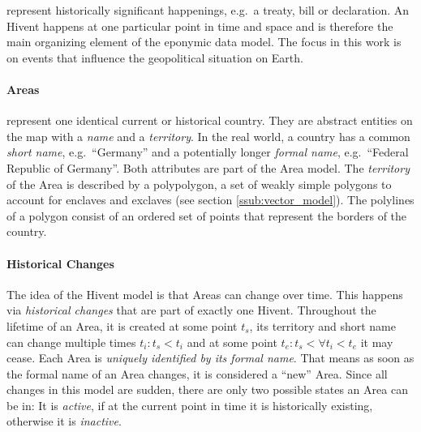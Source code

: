 represent historically significant happenings, e.g.\ a treaty, bill or declaration.
An Hivent happens at one particular point in time and space and is therefore the main organizing element of the eponymic data model.
The focus in this work is on events that influence the geopolitical situation on Earth.


\vspace{-1em}
\paragraph{Areas} %
\label{par:area}

represent one identical current or historical country. They are abstract entities on the map with a \emph{name} and a \emph{territory}. In the real world, a country has a common \emph{short name}, e.g.\ ``Germany'' and a potentially longer \emph{formal name}, e.g.\ ``Federal Republic of Germany''. Both attributes are part of the Area model. The \emph{territory} of the Area is described by a polypolygon, a set of weakly simple polygons to account for enclaves and exclaves (see section \ref{ssub:vector_model}). The polylines of a polygon consist of an ordered set of points that represent the borders of the country.


\vspace{-1em}
\paragraph{Historical Changes} %
\label{par:historical_changes}

The idea of the Hivent model is that Areas can change over time. This happens via \emph{historical changes} that are part of exactly one Hivent. Throughout the lifetime of an Area, it is created at some point $t_s$, its territory and short name can change multiple times $t_i: t_s < t_i$ and at some point $t_e: t_s < \forall t_i < t_e$ it may cease.
Each Area is \emph{uniquely identified by its formal name}. That means as soon as the formal name of an Area changes, it is considered a ``new'' Area.
Since all changes in this model are sudden, there are only two possible states an Area can be in: It is \emph{active}, if at the current point in time it is historically existing, otherwise it is \emph{inactive}.

